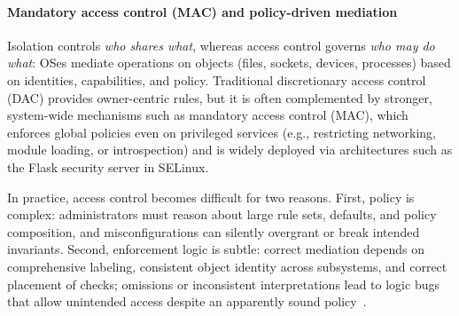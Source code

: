 \paragraph{\textbf{Mandatory access control (MAC) and policy-driven mediation}}


Isolation controls \emph{who shares what}, whereas access control governs \emph{who may do what}: OSes mediate operations on objects (files, sockets, devices, processes) based on identities, capabilities, and policy. 
Traditional discretionary access control (DAC) provides owner-centric rules, but it is often complemented by stronger, system-wide mechanisms such as mandatory access control (MAC), which enforces global policies even on privileged services (e.g., restricting networking, module loading, or introspection) and is widely deployed via architectures such as the Flask security server in SELinux\cite{spencer99flask,loscocco01selinux}.

In practice, access control becomes difficult for two reasons. 
First, policy is complex: administrators must reason about large rule sets, defaults, and policy composition, and misconfigurations can silently overgrant or break intended invariants. 
Second, enforcement logic is subtle: correct mediation depends on comprehensive labeling, consistent object identity across subsystems, and correct placement of checks; omissions or inconsistent interpretations lead to logic bugs that allow unintended access despite an apparently sound policy~\cite{lu2019detecting, zhang2019pex}.

